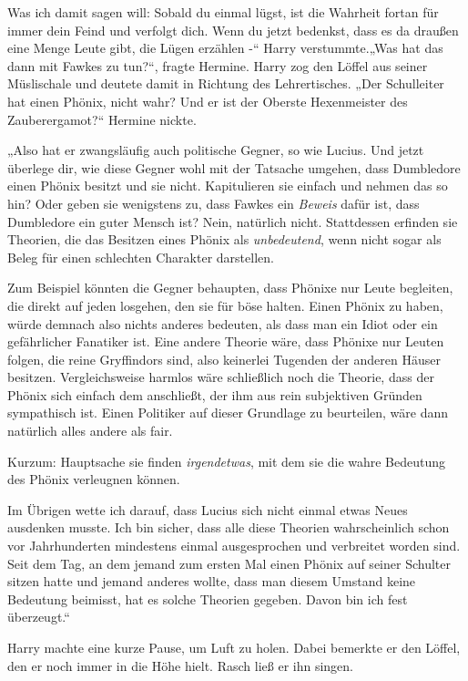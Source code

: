 {Was ich damit sagen will: Sobald du einmal lügst, ist die Wahrheit fortan für immer dein Feind und verfolgt dich. Wenn du jetzt bedenkst, dass es da draußen eine Menge Leute gibt, die Lügen erzählen -“ Harry verstummte.„Was hat das dann mit Fawkes zu tun?“, fragte Hermine. Harry zog den Löffel aus seiner Müslischale und deutete damit in Richtung des Lehrertisches. „Der Schulleiter hat einen Phönix, nicht wahr? Und er ist der Oberste Hexenmeister des Zauberergamot?“ Hermine nickte.

„Also hat er zwangsläufig auch politische Gegner, so wie Lucius. Und jetzt überlege dir, wie diese Gegner wohl mit der Tatsache umgehen, dass Dumbledore einen Phönix besitzt und sie nicht. Kapitulieren sie einfach und nehmen das so hin? Oder geben sie wenigstens zu, dass Fawkes ein \emph{Beweis} dafür ist, dass Dumbledore ein guter Mensch ist? Nein, natürlich nicht. Stattdessen erfinden sie Theorien, die das Besitzen eines Phönix als \emph{unbedeutend}, wenn nicht sogar als Beleg für einen schlechten Charakter darstellen.

Zum Beispiel könnten die Gegner behaupten, dass Phönixe nur Leute begleiten, die direkt auf jeden losgehen, den sie für böse halten. Einen Phönix zu haben, würde demnach also nichts anderes bedeuten, als dass man ein Idiot oder ein gefährlicher Fanatiker ist. Eine andere Theorie wäre, dass Phönixe nur Leuten folgen, die reine Gryffindors sind, also keinerlei Tugenden der anderen Häuser besitzen. Vergleichsweise harmlos wäre schließlich noch die Theorie, dass der Phönix sich einfach dem anschließt, der ihm aus rein subjektiven Gründen sympathisch ist. Einen Politiker auf dieser Grundlage zu beurteilen, wäre dann natürlich alles andere als fair.

Kurzum: Hauptsache sie finden \emph{irgendetwas}, mit dem sie die wahre Bedeutung des Phönix verleugnen können.

Im Übrigen wette ich darauf, dass Lucius sich nicht einmal etwas Neues ausdenken musste. Ich bin sicher, dass alle diese Theorien wahrscheinlich schon vor Jahrhunderten mindestens einmal ausgesprochen und verbreitet worden sind. Seit dem Tag, an dem jemand zum ersten Mal einen Phönix auf seiner Schulter sitzen hatte und jemand anderes wollte, dass man diesem Umstand keine Bedeutung beimisst, hat es solche Theorien gegeben. Davon bin ich fest überzeugt.“

Harry machte eine kurze Pause, um Luft zu holen. Dabei bemerkte er den Löffel, den er noch immer in die Höhe hielt. Rasch ließ er ihn singen.

}

